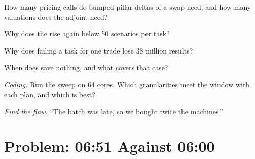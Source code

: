 \begin{exercise}[$\star$]\label{exo:pl:the-risk-grid:3}
How many pricing calls do bumped pillar deltas of a swap need, and how many valuations does the adjoint need?
\end{exercise}

\begin{exercise}[$\star\star$]\label{exo:pl:the-risk-grid:4}
Why does the  rise again below 50 scenarios per task?
\end{exercise}

\begin{exercise}[$\star\star$]\label{exo:pl:the-risk-grid:5}
Why does failing a task for one trade lose 38 million results?
\end{exercise}

\begin{exercise}[$\star\star$]\label{exo:pl:the-risk-grid:6}
When does  save nothing, and what covers that case?
\end{exercise}

\begin{exercise}[$\star\star\star$]\label{exo:pl:the-risk-grid:7}
\emph{Coding.} Run the sweep on 64 cores. Which granularities meet the window with each plan, and which is best?
\end{exercise}

\begin{exercise}[$\star\star\star$]\label{exo:pl:the-risk-grid:8}
\emph{Find the flaw.} ``The batch was late, so we bought twice the machines.''
\end{exercise}

\section{Problem: 06:51 Against 06:00}

